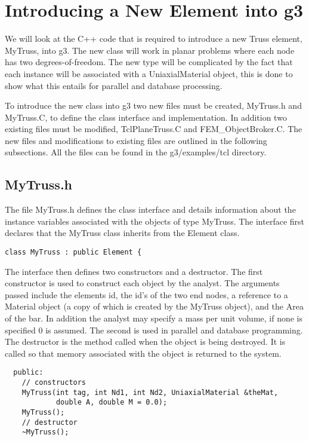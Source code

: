 \documentclass[12pt]{article}
\begin{document}
\section{Introducing a New Element into g3}
We will look at the C++ code that is required to introduce a new Truss
element, MyTruss, into g3. The new class will work in planar problems
where each node has two degrees-of-freedom. The new type will be
complicated by the fact that each instance will be associated with a
UniaxialMaterial object, this is done to show what this entails for
parallel and database processing.

To introduce the new class into g3 two new files must be created, {\sf
MyTruss.h} and {\sf MyTruss.C}, to define the class interface and
implementation. In addition two existing files must be modified, {\sf
TclPlaneTruss.C} and {\sf FEM\_ObjectBroker.C}. The new files and
modifications to existing files are outlined in the following
subsections. All the files can be found in the {\sf g3/examples/tcl}
directory. 

\subsection {\sf MyTruss.h}
The file {\sf MyTruss.h} defines the class interface and details
information about the instance variables associated with the objects
of type MyTruss. The interface first declares that the MyTruss class
inherits from the Element class.  

{\sf\small \begin{verbatim}
class MyTruss : public Element {
\end{verbatim} }

The interface then defines two constructors and a destructor. The
first constructor is used to construct each object by the analyst. The
arguments passed include the elements id, the id's of the two end
nodes, a reference to a Material object (a copy of which is created by
the MyTruss object), and the Area of the
bar. In addition the analyst may specify a mass per unit volume, if
none is specified $0$ is assumed. The second is used in parallel and
database programming. The destructor is the method called when the
object is being destroyed. It is called so that memory associated with
the object is returned to the system.  

{\sf\small \begin{verbatim}
  public:
    // constructors
    MyTruss(int tag, int Nd1, int Nd2, UniaxialMaterial &theMat,
            double A, double M = 0.0); 
    MyTruss();    
    // destructor
    ~MyTruss();
\end{verbatim} }
\end{document}
